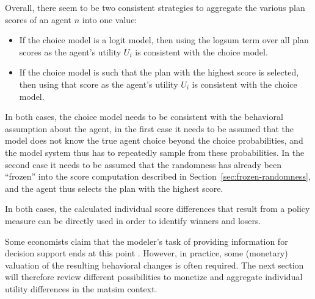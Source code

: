 Overall, there seem to be two consistent strategies to aggregate the various plan scores of an agent $n$ into one value:
\begin{itemize}\styleItemize

\item If the choice model is a logit model, then using the logsum term over all plan scores as the agent's utility $U_i$ is consistent with the choice model.

\item If the choice model is such that the plan with the highest score is selected, then using that score as the agent's utility $U_i$ is consistent with the choice model.

\end{itemize}
In both cases, the choice model needs to be consistent with the behavioral assumption about the agent, \ie in the first case it needs to be assumed that the model does not know the true agent choice beyond the choice probabilities, and the model system thus has to repeatedly sample from these probabilities.  In the second case it needs to be assumed that the randomness has already been ``frozen'' into the score computation described in Section~\ref{sec:frozen-randomness}, and the agent thus selects the plan with the highest score.

%
In both cases, the calculated individual score differences that result from a policy measure can be directly used in order to identify winners and losers.
%

Some economists claim that the modeler's task of providing information for decision support ends at this point \citep{AhlheimRose1989MessungIndividuellerWohlfahrt}. However, in practice, some (monetary) valuation of the resulting behavioral changes is often required. The next section will therefore review different possibilities to monetize and aggregate individual utility differences in the \acrshort{matsim} context.

